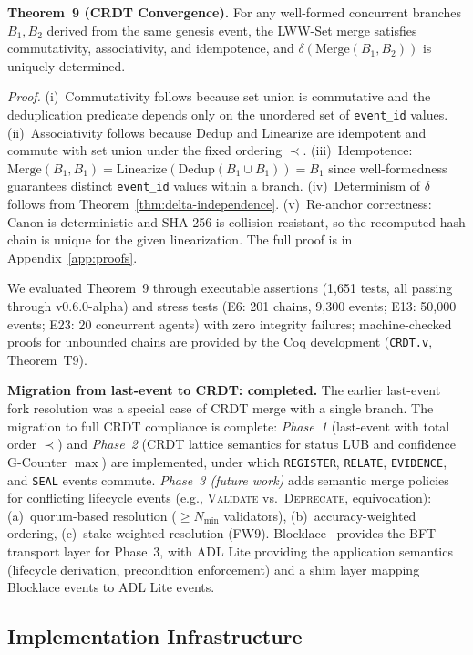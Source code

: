 \textbf{Theorem~9 (CRDT Convergence).} For any well-formed concurrent branches $B_1, B_2$ derived from the same genesis event, the LWW-Set merge satisfies commutativity, associativity, and idempotence, and $\delta(\text{Merge}(B_1, B_2))$ is uniquely determined.

\emph{Proof.} (i)~Commutativity follows because set union is commutative and the deduplication predicate depends only on the unordered set of \texttt{event\_id} values. (ii)~Associativity follows because $\text{Dedup}$ and $\text{Linearize}$ are idempotent and commute with set union under the fixed ordering $\prec$. (iii)~Idempotence: $\text{Merge}(B_1, B_1) = \text{Linearize}(\text{Dedup}(B_1 \cup B_1)) = B_1$ since well-formedness guarantees distinct \texttt{event\_id} values within a branch. (iv)~Determinism of $\delta$ follows from Theorem~\ref{thm:delta-independence}. (v)~Re-anchor correctness: $\text{Canon}$ is deterministic and SHA-256 is collision-resistant, so the recomputed hash chain is unique for the given linearization. The full proof is in Appendix~\ref{app:proofs}.

We evaluated Theorem~9 through executable assertions (1,651 tests, all passing through v0.6.0-alpha) and stress tests (E6: 201 chains, 9,300 events; E13: 50,000 events; E23: 20 concurrent agents) with zero integrity failures; machine-checked proofs for unbounded chains are provided by the Coq development (\texttt{CRDT.v}, Theorem~T9).

\textbf{Migration from last-event to CRDT: completed.} The earlier last-event fork resolution was a special case of CRDT merge with a single branch. The migration to full CRDT compliance is complete: \emph{Phase~1} (last-event with total order $\prec$) and \emph{Phase~2} (CRDT lattice semantics for status LUB and confidence G-Counter $\max$) are implemented, under which \texttt{REGISTER}, \texttt{RELATE}, \texttt{EVIDENCE}, and \texttt{SEAL} events commute. \emph{Phase~3 (future work)} adds semantic merge policies for conflicting lifecycle events (e.g., \textsc{Validate} vs.\ \textsc{Deprecate}, equivocation): (a)~quorum-based resolution ($\geq N_{\min}$ validators), (b)~accuracy-weighted ordering, (c)~stake-weighted resolution (FW9). Blocklace~\cite{blocklace2024} provides the BFT transport layer for Phase~3, with ADL Lite providing the application semantics (lifecycle derivation, precondition enforcement) and a shim layer mapping Blocklace events to ADL Lite events.

\subsection{Implementation Infrastructure}\label{subsec:implementation-infrastructure}

